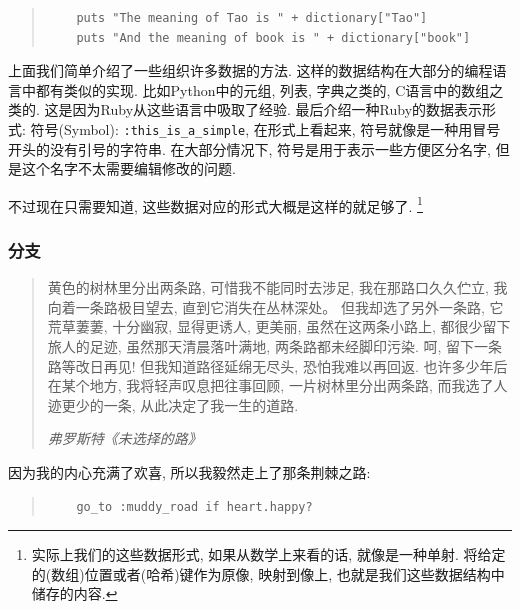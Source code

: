 \begin{quotation}
  \begin{verbatim}
    puts "The meaning of Tao is " + dictionary["Tao"]
    puts "And the meaning of book is " + dictionary["book"]
  \end{verbatim}
\end{quotation}

上面我们简单介绍了一些组织许多数据的方法. 这样的数据结构在大部分的编程语言中都有类似的实现. 比如Python中的元组, 列表, 字典之类的, C语言中的数组之类的. 这是因为Ruby从这些语言中吸取了经验. 最后介绍一种Ruby的数据表示形式: 符号(Symbol): \texttt{:this_is_a_simple}, 在形式上看起来, 符号就像是一种用冒号开头的没有引号的字符串. 在大部分情况下, 符号是用于表示一些方便区分名字, 但是这个名字不太需要编辑修改的问题. 

不过现在只需要知道, 这些数据对应的形式大概是这样的就足够了. \footnote{实际上我们的这些数据形式, 如果从数学上来看的话, 就像是一种单射. 将给定的(数组)位置或者(哈希)键作为原像, 映射到像上, 也就是我们这些数据结构中储存的内容. }

\subsubsection*{分支}
\begin{quotation}
  黄色的树林里分出两条路, 可惜我不能同时去涉足, 我在那路口久久伫立, 我向着一条路极目望去, 直到它消失在丛林深处。 但我却选了另外一条路, 它荒草萋萋, 十分幽寂, 显得更诱人, 更美丽, 虽然在这两条小路上, 都很少留下旅人的足迹, 虽然那天清晨落叶满地, 两条路都未经脚印污染. 呵, 留下一条路等改日再见! 但我知道路径延绵无尽头, 恐怕我难以再回返. 也许多少年后在某个地方, 我将轻声叹息把往事回顾, 一片树林里分出两条路, 而我选了人迹更少的一条, 从此决定了我一生的道路. 

  \emph{弗罗斯特《未选择的路》}
\end{quotation}

因为我的内心充满了欢喜, 所以我毅然走上了那条荆棘之路: 

\begin{quotation}
  \begin{verbatim}
    go_to :muddy_road if heart.happy?
  \end{verbatim}
\end{quotation}

